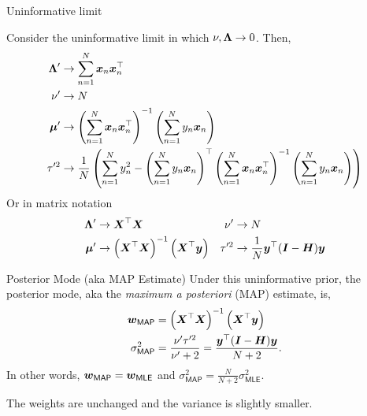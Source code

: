 \documentclass[aspectratio=169]{beamer}
\begin{document}
\begin{frame}{Uninformative limit}

Consider the uninformative limit in which $\nu, \boldsymbol{\Lambda} \to 0$. Then,
\begin{align}
    \boldsymbol{\Lambda}' &\to \sum_{n=1}^N \boldsymbol{x}_n \boldsymbol{x}_n^\top \\
    \nu' &\to N \\
    \boldsymbol{\mu}' &\to \left(\sum_{n=1}^N \boldsymbol{x}_n \boldsymbol{x}_n^\top \right)^{-1} \left(\sum_{n=1}^N y_n \boldsymbol{x}_n \right) \\
    \tau'^2 &\to \frac{1}{N}\left(\sum_{n=1}^N y_n^2 - \left(\sum_{n=1}^N y_n \boldsymbol{x}_n \right)^\top \left(\sum_{n=1}^N \boldsymbol{x}_n \boldsymbol{x}_n^\top \right)^{-1} \left(\sum_{n=1}^N y_n \boldsymbol{x}_n \right) \right)
\end{align}
Or in matrix notation
\begin{align}
    \boldsymbol{\Lambda}' &\to \boldsymbol{X}^\top \boldsymbol{X} &
    \nu' &\to N \\
    \boldsymbol{\mu}' &\to \left(\boldsymbol{X}^\top \boldsymbol{X} \right)^{-1} \left(\boldsymbol{X}^\top \boldsymbol{y} \right) &
    \tau'^2 &\to \frac{1}{N} \boldsymbol{y}^\top (\boldsymbol{I} - \boldsymbol{H}) \boldsymbol{y}
\end{align}

\end{frame}

\begin{frame}{Posterior Mode (aka MAP Estimate)}
Under this uninformative prior, the posterior mode, aka the \emph{maximum a posteriori} (MAP) estimate, is,
\begin{align}
    \boldsymbol{w}_{\mathsf{MAP}} &= \left(\boldsymbol{X}^\top \boldsymbol{X} \right)^{-1} \left(\boldsymbol{X}^\top \boldsymbol{y} \right) \\
    \sigma^2_{\mathsf{MAP}} &= \frac{\nu' \tau'^2}{\nu' + 2} = \frac{\boldsymbol{y}^\top (\boldsymbol{I} - \boldsymbol{H}) \boldsymbol{y}}{N + 2}.
\end{align}
In other words, $\boldsymbol{w}_{\mathsf{MAP}} = \boldsymbol{w}_{\mathsf{MLE}}$ and $\sigma^2_{\mathsf{MAP}} = \frac{N}{N+2} \sigma^2_{\mathsf{MLE}}$. 

The weights are unchanged and the variance is slightly smaller.

\end{frame}
\end{document}
